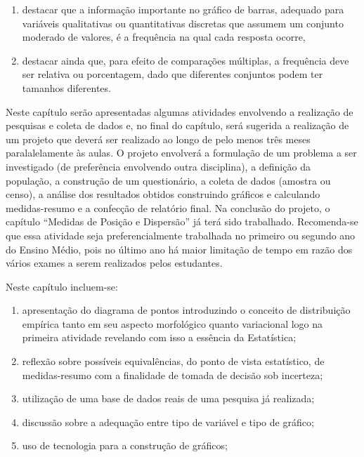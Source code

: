 \begin{apresentacao}
\begin{enumerate}
\item {} 
destacar que a informação importante no gráfico de barras, adequado para variáveis qualitativas ou quantitativas discretas que assumem um conjunto moderado de valores, é a frequência na qual cada resposta ocorre,

\item {} 
destacar ainda que, para efeito de comparações múltiplas, a frequência deve ser relativa ou porcentagem, dado que diferentes conjuntos podem ter tamanhos diferentes.

\end{enumerate}

Neste capítulo serão apresentadas algumas atividades envolvendo a realização de pesquisas e coleta de dados e, no final do capítulo, será sugerida a realização de um projeto que deverá ser realizado ao longo de pelo menos três meses paralalelamente às aulas. O projeto envolverá a formulação de um problema a ser investigado (de preferência envolvendo outra disciplina), a definição da população, a construção de um questionário, a coleta de dados (amostra ou censo), a análise dos resultados obtidos construindo gráficos e calculando medidas-resumo e a confecção de relatório final. Na conclusão do projeto, o capítulo “Medidas de Posição e Dispersão” já terá sido trabalhado. Recomenda-se que essa atividade seja preferencialmente trabalhada no primeiro ou segundo ano do Ensino Médio, pois no último ano há maior limitação de tempo em razão dos vários exames a serem realizados pelos estudantes.


Neste capítulo incluem-se:
\begin{enumerate}
\item {} 
apresentação do diagrama de pontos introduzindo o conceito de distribuição empírica tanto em seu aspecto morfológico quanto variacional logo na primeira atividade revelando com isso a essência da Estatística;

\item {} 
reflexão sobre possíveis equivalências, do ponto de vista estatístico, de medidas-resumo com a finalidade de tomada de decisão sob incerteza;

\item {} 
utilização de uma base de dados reais de uma pesquisa já realizada;

\item {} 
discussão sobre a adequação entre tipo de variável e tipo de gráfico;

\item {} 
uso de tecnologia para a construção de gráficos;


\end{enumerate}
\end{apresentacao}
